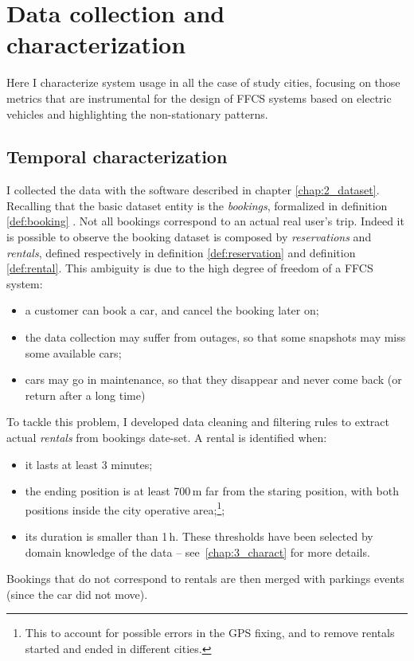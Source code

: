 \section{Data collection and characterization}
\label{sec:6_3_data}

Here I characterize system usage in all the case of study cities, focusing on those metrics that are instrumental for the design of FFCS systems based on electric vehicles and highlighting the non-stationary patterns. 

\subsection{Temporal characterization}
I collected the data with the software described in chapter \ref{chap:2_dataset}. Recalling that the basic dataset entity is the \textit{bookings}, formalized in definition \ref{def:booking} . Not all bookings correspond to an actual real user's trip. Indeed it is possible to observe the booking dataset is composed by \textit{reservations} and \textit{rentals}, defined respectively in definition \ref{def:reservation} and definition \ref{def:rental}. This ambiguity is due to the high degree of freedom of a FFCS system:
\begin{itemize}
	\item a customer can book a car, and cancel the booking later on;
	\item the data collection may suffer from outages, so that some snapshots may miss some available cars;
	\item cars may go in maintenance, so that they disappear and never come back (or return after a long time)
\end{itemize}

To tackle this problem, I developed data cleaning and filtering rules to extract actual \textit{rentals} from bookings date-set. A rental is identified when:
\begin{itemize}
	\item it lasts at least 3 minutes;
	\item the ending position is at least 700\,m far from the staring position, with both positions inside the city operative area;\footnote{This to account for possible errors in the GPS fixing, and to remove rentals started and ended in different cities.};
	\item its duration is smaller than 1\,h. These thresholds have been selected by domain knowledge of the data -- see~\ref{chap:3_charact} for more details.
	
\end{itemize}
Bookings that do not correspond to rentals are then merged with parkings events (since the car did not move).

